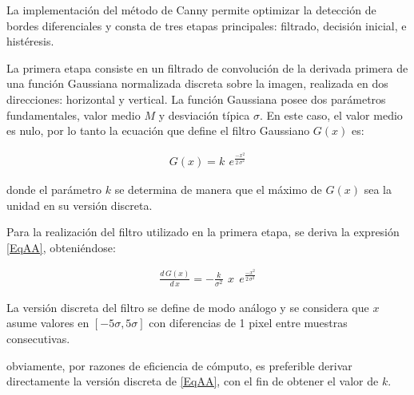 La implementaci\'on del m\'etodo de Canny permite optimizar la detecci\'on de bordes diferenciales y consta de tres etapas principales: 
filtrado, decisi\'on inicial, e hist\'eresis.
%

La primera etapa consiste en un filtrado de convoluci\'on de la derivada primera de una funci\'on Gaussiana normalizada discreta sobre la 
imagen, realizada en dos direcciones: horizontal y vertical. 
%
La funci\'on Gaussiana posee dos par\'ametros fundamentales, valor medio $M$ y desviaci\'on t\'ipica $\sigma$.
%
En este caso, el valor medio es nulo, por lo tanto la ecuaci\'on que define el filtro Gaussiano $G(x)$ es:

\begin{eqnarray}
	G(x) = k \, \: e^\frac{-x^2}{2 \, \sigma^2}
\label{EqAA}
\end{eqnarray}

donde el par\'ametro $k$ se determina de manera que el m\'aximo de $G(x)$ sea la unidad en su versi\'on discreta. 
%

Para la realizaci\'on del filtro utilizado en la primera etapa, se deriva la expresi\'on \ref{EqAA}, obteni\'endose:

\begin{eqnarray}
	\frac{d \, G(x)}{d \, x} = -\frac{k}{\sigma^2} \, \: x \, \; e^\frac{-x^2}{2 \, \sigma^2}
\label{EqAB}
\end{eqnarray}

La versi\'on discreta del filtro se define de modo an\'alogo y se considera que $x$ asume valores en $[-5 \sigma, 5 \sigma]$ con 
diferencias de 1 pixel entre muestras consecutivas. 
%

obviamente, por razones de eficiencia de c\'omputo, es preferible derivar directamente la versi\'on discreta de \ref{EqAA}, con el fin de 
obtener el valor de $k$.